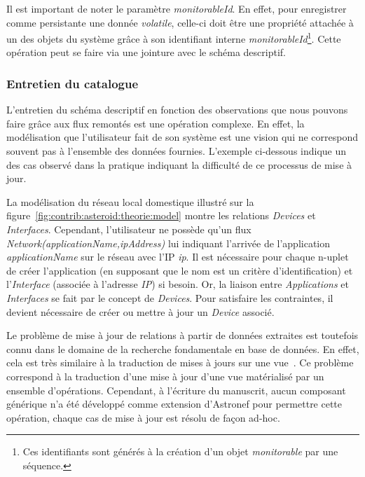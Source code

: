 Il est important de noter le paramètre \textit{monitorableId}. En effet, pour enregistrer comme persistante une donnée \textit{volatile}, celle-ci doit être une propriété attachée à un des objets du système grâce à son identifiant interne \textit{monitorableId}\footnote{Ces identifiants sont générés à la création d'un objet \textit{monitorable} par une séquence.}. Cette opération peut se faire via une jointure avec le schéma descriptif.

\subsubsection{Entretien du catalogue}
L'entretien du schéma descriptif en fonction des observations que nous pouvons faire grâce aux flux remontés est une opération complexe. En effet, la modélisation que l'utilisateur fait de son système est une vision qui ne correspond souvent pas à l'ensemble des données fournies. L'exemple ci-dessous indique un des cas observé dans la pratique indiquant la difficulté de ce processus de mise à jour.

\begin{example}
La modélisation du réseau local domestique illustré sur la figure~\ref{fig:contrib:asteroid:theorie:model} montre les relations \textit{Devices} et \textit{Interfaces}. Cependant, l'utilisateur ne possède qu'un flux \textit{Network(applicationName,ipAddress)} lui indiquant l'arrivée de l'application \textit{applicationName} sur le réseau avec l'IP \textit{ip}. Il est nécessaire pour chaque n-uplet de créer l'application (en supposant que le nom est un critère d'identification) et l'\textit{Interface} (associée à l'adresse \textit{IP}) si besoin. Or, la liaison entre \textit{Applications} et \textit{Interfaces} se fait par le concept de \textit{Devices}. Pour satisfaire les contraintes, il devient nécessaire de créer ou mettre à jour un \textit{Device} associé.
\end{example}

Le problème de mise à jour de relations à partir de données extraites est toutefois connu dans le domaine de la recherche fondamentale en base de données. En effet, cela est très similaire à la traduction de mises à jours sur une vue~\cite{Keller:viewupdate}. Ce problème correspond à la traduction d'une mise à jour d'une vue matérialisé par un ensemble d'opérations. Cependant, à l'écriture du manuscrit, aucun composant générique n'a été développé comme extension d'Astronef pour permettre cette opération, chaque cas de mise à jour est résolu de façon ad-hoc.
